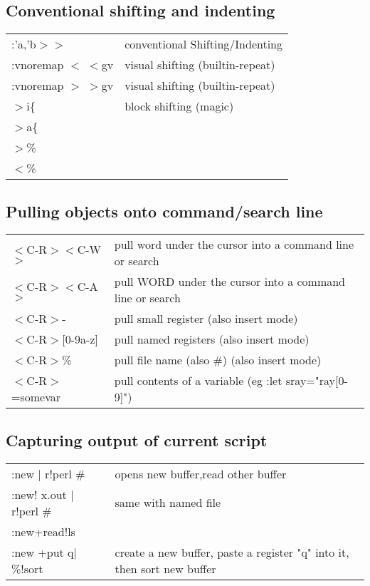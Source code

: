 \subsection{Conventional shifting and indenting}
\begin{center}
\begin{longtable}{l|l}
 :'a,'b$>$$>$ & conventional Shifting/Indenting\\
 :vnoremap $<$ $<$gv & visual shifting (builtin-repeat)\\
 :vnoremap $>$ $>$gv & visual shifting (builtin-repeat)\\
 $>$i\{ & block shifting (magic)\\
 $>$a\{\\
 $>$\%\\
 $<$\%
\end{longtable}
\end{center}

\subsection{Pulling objects onto command/search line}
\begin{center}
\begin{longtable}{l|l}
$<$C-R$>$$<$C-W$>$ & pull word under the cursor into a command line or search\\
$<$C-R$>$$<$C-A$>$ & pull WORD under the cursor into a command line or search\\
$<$C-R$>$-                  & pull small register (also insert mode)\\
$<$C-R$>$[0-9a-z]           & pull named registers (also insert mode)\\
$<$C-R$>$\%                  & pull file name (also \#) (also insert mode)\\
$<$C-R$>$=somevar           & pull contents of a variable (eg :let sray="ray[0-9]")
\end{longtable}
\end{center}

\subsection{Capturing output of current script}
\begin{center}
\begin{longtable}{l|l}
 :new $|$ r!perl \# & opens new buffer,read other buffer\\
 :new! x.out $|$ r!perl \# & same with named file\\
 :new+read!ls\\
 :new +put q$|$\%!sort & create a new buffer, paste a register "q" into it, then sort new buffer
\end{longtable}
\end{center}


